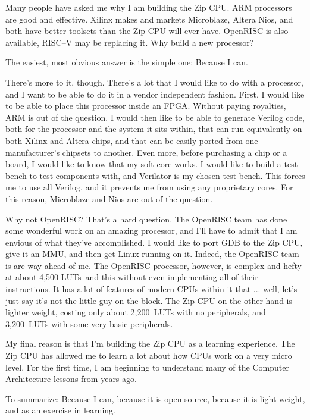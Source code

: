 \documentclass{gqtekspec}
\begin{document}
\begin{preface}
Many people have asked me why I am building the Zip CPU. ARM processors are
good and effective. Xilinx makes and markets Microblaze, Altera Nios, and both
have better toolsets than the Zip CPU will ever have. OpenRISC is also
available, RISC--V may be replacing it. Why build a new processor?

The easiest, most obvious answer is the simple one: Because I can.

There's more to it, though. There's a lot that I would like to do with a
processor, and I want to be able to do it in a vendor independent fashion.
First, I would like to be able to place this processor inside an FPGA.  Without
paying royalties, ARM is out of the question.  I would then like to be able to
generate Verilog code, both for the processor and the system it sits within,
that can run equivalently on both Xilinx and Altera chips, and that can be
easily ported from one manufacturer's chipsets to another. Even more, before
purchasing a chip or a board, I would like to know that my soft core works. I
would like to build a test bench to test components with, and Verilator is my
chosen test bench. This forces me to use all Verilog, and it prevents me from
using any proprietary cores. For this reason, Microblaze and Nios are out of
the question.

Why not OpenRISC? That's a hard question. The OpenRISC team has done some
wonderful work on an amazing processor, and I'll have to admit that I am
envious of what they've accomplished. I would like to port GDB to the
Zip CPU, give it an MMU, and then get Linux running on it. Indeed, the
OpenRISC team is are way ahead of me. The OpenRISC processor, however, is
complex and hefty at about 4,500 LUTs--and this without even implementing all
of their instructions. It has a lot of features of modern CPUs within it
that ... well, let's just say it's not the little guy on the block. The
Zip CPU on the other hand is lighter weight, costing only about 2,200~LUTs
with no peripherals, and 3,200~LUTs with some very basic peripherals.

My final reason is that I'm building the Zip CPU as a learning experience. The
Zip CPU has allowed me to learn a lot about how CPUs work on a very micro
level. For the first time, I am beginning to understand many of the Computer
Architecture lessons from years ago.

To summarize: Because I can, because it is open source, because it is light
weight, and as an exercise in learning. 

\end{preface}
\end{document}
